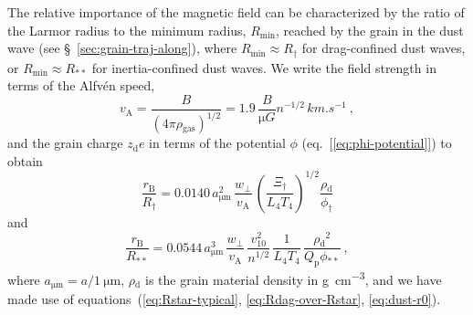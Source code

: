 \message{ !name(dusty-bow-wave.tex)}\documentclass[useAMS, usenatbib, a4paper]{mnras}
\newcommand\Qp{\ensuremath{Q_{\text{p}}}}
\newcommand{\grain}{\ensuremath{_{\text{d}}}}
\newcommand{\B}{\ensuremath{_{\scriptscriptstyle\text{B}}}}
\newcommand{\alfven}{\ensuremath{_{\scriptscriptstyle\text{A}}}}
\newcommand{\gas}{\ensuremath{_{\text{gas}}}}
\newcommand\Rmin{\ensuremath{R_{\scriptscriptstyle\text{min}}}}
\newcommand\starstar{\ensuremath{_{**}}}
\begin{document}
The relative importance of the magnetic field can be characterized by
the ratio of the Larmor radius to the minimum radius, \(\Rmin\),
reached by the grain in the dust wave (see
\S~\ref{sec:grain-traj-along}), where \(\Rmin \approx R_\dag\) for
drag-confined dust waves, or \(\Rmin \approx R\starstar\) for
inertia-confined dust waves.  We write the field strength in terms of
the Alfvén speed,
\begin{equation}
  \label{eq:alfven}
  v\alfven = \frac{B}{(4\pi\rho\gas)^{1/2}}
  = 1.9\, \frac{B}{\si{\micro G}} n^{-1/2} \, \si{km.s^{-1}} \ ,
\end{equation}
and the grain charge \(z\grain e\) in terms of the potential \(\phi\) (eq.~[\ref{eq:phi-potential}]) to obtain
\begin{equation}
  \label{eq:larmor-over-Rdag}
  \frac{r\B}{R_\dag} = 0.0140 \,
  a_{\si{\um}}^2 \,
  \frac{w_\perp}{v\alfven} \,
  \left( \frac{\Xi_\dag}{L_4 T_4} \right)^{1/2}
  \frac{\rho\grain}{\phi_\dag}
\end{equation}
and
\begin{equation}
  \label{eq:larmor-over-Rstarstar}
  \frac{r\B}{R\starstar} = 0.0544 \,
  a_{\si{\um}}^3 \,
  \frac{w_\perp}{v\alfven} \,
  \frac{v_{10}^2 }{n^{1/2}} \,
  \frac{1}{L_4 T_4} \,
  \frac{\rho\grain^2}{\Qp \phi\starstar} \ ,
\end{equation}
where \(a_{\si{\um}} = a / \SI{1}{\um}\), \(\rho\grain\) is the grain
material density in \si{g.cm^{-3}}, and we have made use of
equations~(\ref{eq:Rstar-typical}, \ref{eq:Rdag-over-Rstar},
\ref{eq:dust-r0}).
\end{document}
